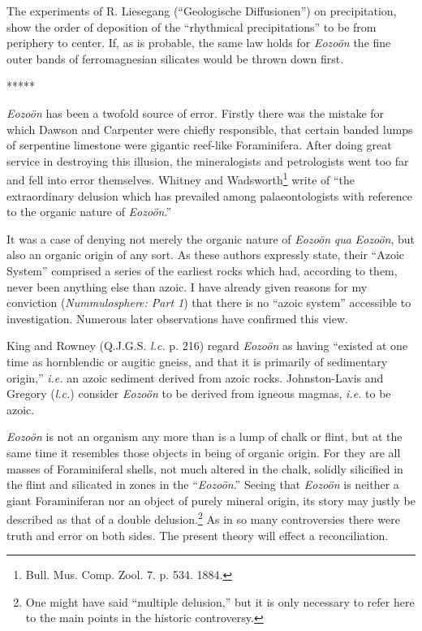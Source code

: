 \documentclass[a4paper, 12pt, oneside, landscape]{article}
\begin{document}
The experiments of R. Liesegang (``Geologische Diffusionen'') on precipitation, show the order of deposition of the ``rhythmical precipitations'' to be from periphery to center. If, as is probable, the same law holds for \emph{Eozoön} the fine outer bands of ferromagnesian silicates would be thrown down first. 

\centerline{*\hspace{15mm}*\hspace{15mm}*\hspace{15mm}*\hspace{15mm}*}
\bigskip

\emph{Eozoön} has been a twofold source of error. Firstly there was the mistake for which Dawson and Carpenter were chiefly responsible, that certain banded lumps of serpentine limestone were gigantic reef-like Foraminifera. After doing great service in destroying this illusion, the mineralogists and petrologists went too far and fell into error themselves. Whitney and Wadsworth\footnote{Bull. Mus. Comp. Zool. 7. p. 534. 1884.} write of ``the extraordinary delusion which has prevailed among palaeontologists with reference to the organic nature of \emph{Eozoön}.''

It was a case of denying not merely the organic nature of \emph{Eozoön} \emph{qua} \emph{Eozoön}, but also an organic origin of any sort. As these authors expressly state, their ``Azoic System'' comprised a series of the earliest rocks which had, according to them, never been anything else than azoic. I have already given reasons for my conviction (\emph{Nummulosphere: Part 1}) that there is no ``azoic system'' accessible to investigation. Numerous later observations have confirmed this view.

King and Rowney (Q.J.G.S. \emph{l.c.} p. 216) regard \emph{Eozoön} as having ``existed at one time as hornblendic or augitic gneiss, and that it is primarily of sedimentary origin,'' \emph{i.e.} an azoic sediment derived from azoic rocks. Johnston-Lavis and Gregory (\emph{l.c.}) consider \emph{Eozoön} to be derived from igneous magmas, \emph{i.e.} to be azoic.

\emph{Eozoön} is not an organism any more than is a lump of chalk or flint, but at the same time it resembles those objects in being of organic origin. For they are all masses of Foraminiferal shells, not much altered in the chalk, solidly silicified in the flint and silicated in zones in the ``\emph{Eozoön}.'' Seeing that \emph{Eozoön} is neither a giant Foraminiferan nor an object of purely mineral origin, its story may justly be described as that of a double delusion.\footnote{One might have said ``multiple delusion,'' but it is only necessary to refer here to the main points in the historic controversy.} As in so many controversies there were truth and error on both sides. The present theory will effect a reconciliation.
\end{document}

